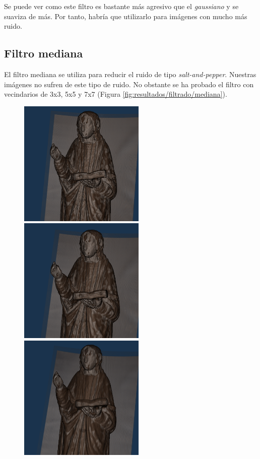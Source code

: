 Se puede ver como este filtro es bastante más agresivo que el \textit{gaussiano} y se suaviza de más. Por tanto, habría que utilizarlo para imágenes con mucho más ruido.

\subsection{Filtro mediana}

El filtro mediana se utiliza para reducir el ruido de tipo \textit{salt-and-pepper}. Nuestras imágenes no sufren de este tipo de ruido. No obstante se ha probado el filtro con vecindarios de 3x3, 5x5 y 7x7 (Figura \ref{fig:resultados/filtrado/mediana}).

\begin{figure}[H]
	\centering
	\includegraphics[width=6cm]{imagenes/resultados/filtrado/original}
	\includegraphics[width=6cm]{imagenes/resultados/filtrado/mediana-3}
	\includegraphics[width=6cm]{imagenes/resultados/filtrado/mediana-5}

\end{figure}
